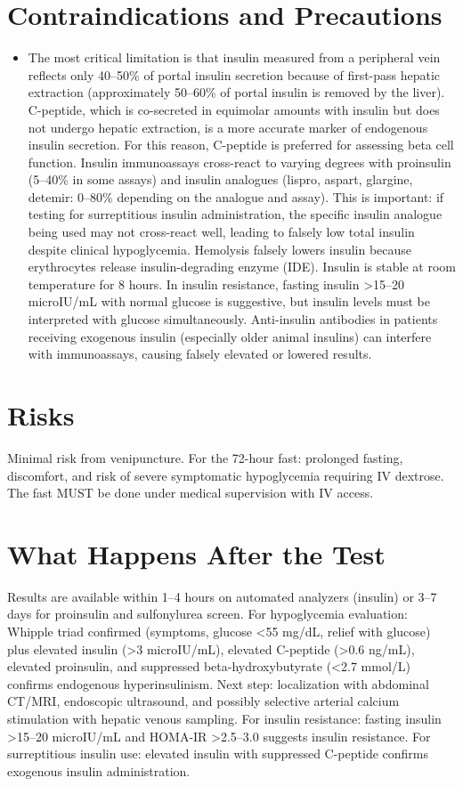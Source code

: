 \section*{Contraindications and Precautions}
\begin{itemize}
  \item The most critical limitation is that insulin measured from a peripheral vein reflects only 40--50\% of portal insulin secretion because of first-pass hepatic extraction (approximately 50--60\% of portal insulin is removed by the liver). C-peptide, which is co-secreted in equimolar amounts with insulin but does not undergo hepatic extraction, is a more accurate marker of endogenous insulin secretion. For this reason, C-peptide is preferred for assessing beta cell function. Insulin immunoassays cross-react to varying degrees with proinsulin (5--40\% in some assays) and insulin analogues (lispro, aspart, glargine, detemir: 0--80\% depending on the analogue and assay). This is important: if testing for surreptitious insulin administration, the specific insulin analogue being used may not cross-react well, leading to falsely low total insulin despite clinical hypoglycemia. Hemolysis falsely lowers insulin because erythrocytes release insulin-degrading enzyme (IDE). Insulin is stable at room temperature for 8 hours. In insulin resistance, fasting insulin >15--20 microIU/mL with normal glucose is suggestive, but insulin levels must be interpreted with glucose simultaneously. Anti-insulin antibodies in patients receiving exogenous insulin (especially older animal insulins) can interfere with immunoassays, causing falsely elevated or lowered results.
\end{itemize}
\section*{Risks}
Minimal risk from venipuncture. For the 72-hour fast: prolonged fasting, discomfort, and risk of severe symptomatic hypoglycemia requiring IV dextrose. The fast MUST be done under medical supervision with IV access.

\section*{What Happens After the Test}
Results are available within 1--4 hours on automated analyzers (insulin) or 3--7 days for proinsulin and sulfonylurea screen. For hypoglycemia evaluation: Whipple triad confirmed (symptoms, glucose <55 mg/dL, relief with glucose) plus elevated insulin (>3 microIU/mL), elevated C-peptide (>0.6 ng/mL), elevated proinsulin, and suppressed beta-hydroxybutyrate (<2.7 mmol/L) confirms endogenous hyperinsulinism. Next step: localization with abdominal CT/MRI, endoscopic ultrasound, and possibly selective arterial calcium stimulation with hepatic venous sampling. For insulin resistance: fasting insulin >15--20 microIU/mL and HOMA-IR >2.5--3.0 suggests insulin resistance. For surreptitious insulin use: elevated insulin with suppressed C-peptide confirms exogenous insulin administration.

